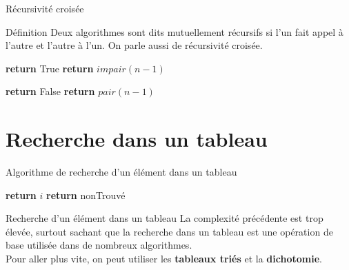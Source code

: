 \documentclass[10pt,xcolor=dvipsnames]{beamer}
\begin{document}
\begin{frame}{Récursivité croisée}
    \begin{exampleblock}{Définition}
Deux algorithmes sont dits mutuellement récursifs si l’un fait appel à l’autre et l’autre à l’un. On parle aussi de récursivité croisée.
\end{exampleblock}

\begin{tcolorbox}
  \begin{algorithmic}[1]
        \State \textbf{return} True
        \Else
        \State \textbf{return} $impair(n - 1)$
        \EndIf
    \EndFunction
  \end{algorithmic}
  
    \begin{algorithmic}[1]
        \State \textbf{return} False
        \Else
        \State \textbf{return} $pair(n - 1)$
        \EndIf
    \EndFunction
  \end{algorithmic}
\end{tcolorbox}

\end{frame}


\section{Recherche dans un tableau}

\begin{frame}{Algorithme de recherche d'un élément dans un tableau}
    \begin{tcolorbox}
  \begin{algorithmic}[1]
        
            \State \textbf{return} $i$
        \EndIf
    \EndFor
    \State \textbf{return} nonTrouvé
    \EndFunction
  \end{algorithmic}
\end{tcolorbox}


\end{frame}

\begin{frame}{Recherche d'un élément dans un tableau}
    La complexité précédente est trop élevée, surtout sachant que la recherche dans un tableau est une opération de base utilisée dans de nombreux algorithmes.\\
    
    Pour aller plus vite, on peut utiliser les \textbf{tableaux triés} et la \textbf{dichotomie}.
\end{frame}
\end{document}
